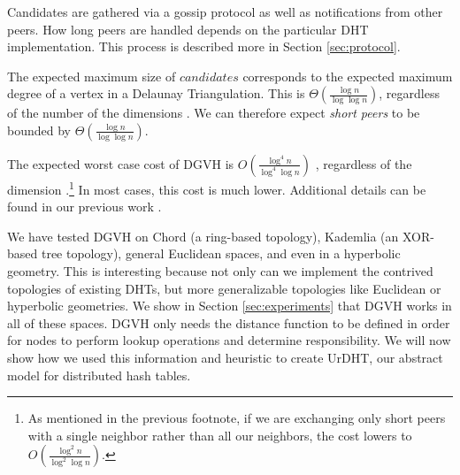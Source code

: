 Candidates are gathered via a gossip protocol as well as notifications from other peers.
How long peers are handled depends on the particular DHT implementation.
This process is described more in Section \ref{sec:protocol}.

The expected maximum size of $ candidates $ corresponds to the expected maximum degree of a vertex in a Delaunay Triangulation.
This is  $\Theta(\frac{\log n}{\log \log n} )$, regardless of the number of the dimensions \cite{bern1991expected}. 
We can therefore expect \textit{short peers} to be bounded by $\Theta(\frac{\log n}{\log \log n})$.

The expected worst case cost of DGVH is \(O(\frac{\log^{4} n}{\log^{4} \log n} )\) \cite{dgvh}, regardless of the dimension \cite{dgvh}.\footnote{As mentioned in the previous footnote, if we are exchanging only short peers with a single neighbor rather than all our neighbors, the cost lowers to \(O(\frac{\log^{2} n}{\log^{2} \log n} )\).}
In most cases, this cost is much lower.
Additional details can be found in our previous work \cite{dgvh}.




We have tested DGVH on Chord (a ring-based topology), Kademlia (an XOR-based tree topology), general Euclidean spaces, and even in a hyperbolic geometry.
This is interesting because not only can we implement the contrived topologies of existing DHTs, but more generalizable topologies like Euclidean or hyperbolic geometries.
We show in Section \ref{sec:experiments} that DGVH works in all of these spaces.
DGVH only needs the distance function to be defined in order for nodes to perform lookup operations and determine responsibility.
%	
We will now show how we used this information and heuristic to create UrDHT, our abstract model for distributed hash tables.





